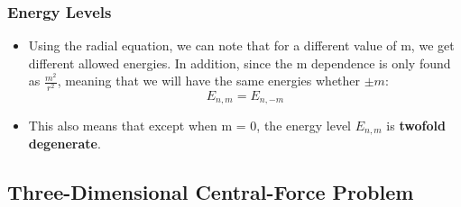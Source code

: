 \documentclass[12pt, letterpaper, twoside]{article}
\begin{document}
\subsubsection{Energy Levels}

\begin{itemize}
    \item Using the radial equation, we can note that for a different value of m, we get different allowed energies. In addition, since the m dependence is only found as $\frac{m^2}{r^2}$, meaning that we will have the same energies whether $\pm m$:
    \begin{equation*}
        E_{n,m} = E_{n, -m}
    \end{equation*}
    \item This also means that except when m = 0, the energy level $E_{n,m}$ is \textbf{twofold degenerate}.
\end{itemize}

\subsection{Three-Dimensional Central-Force Problem}
\end{document}
